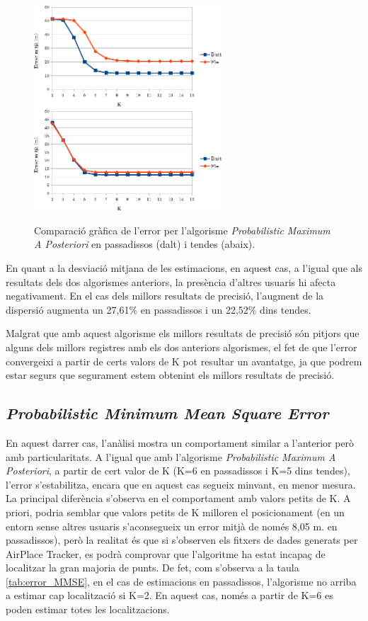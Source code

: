 \begin{figure}[ht]
\begin{center}
\includegraphics[width=7cm]{imatges/map_passadis.png}
\includegraphics[width=7cm]{imatges/map_tenda.png}
\caption{Comparació gràfica de l'error per l'algorisme \textit{Probabilistic Maximum A Posteriori} en passadissos (dalt) i tendes (abaix).}
\label{fig:grafic_MAP}
\end{center}
\end{figure}

En quant a la desviació mitjana de les estimacions, en aquest cas, a l'igual que als resultats dels dos algorismes anteriors, la presència d'altres usuaris hi afecta negativament. En el cas dels millors resultats de precisió, l'augment de la dispersió augmenta un 27,61\% en passadissos i un 22,52\% dins tendes.

Malgrat que amb aquest algorisme els millors resultats de precisió són pitjors que alguns dels millors registres amb els dos anteriors algorismes, el fet de que l'error convergeixi a partir de certs valors de K pot resultar un avantatge, ja que podrem estar segurs que segurament estem obtenint els millors resultats de precisió.

\subsection{\textit{Probabilistic Minimum Mean Square Error}}


En aquest darrer cas, l'anàlisi mostra un comportament similar a l'anterior però amb particularitats. A l'igual que amb l'algorisme \textit{Probabilistic Maximum A Posteriori}, a partir de cert valor de K (K=6 en passadissos i K=5 dins tendes), l'error s'estabilitza, encara que en aquest cas segueix minvant, en menor mesura. La principal diferència s'observa en el comportament amb valors petits de K. A priori, podria semblar que valors petits de K milloren el posicionament (en un entorn sense altres usuaris s'aconsegueix un error mitjà de només 8,05 m. en passadissos), però la realitat és que si s'observen els fitxers de dades generats per AirPlace Tracker, es podrà comprovar que l'algoritme ha estat incapaç de localitzar la gran majoria de punts. De fet, com s'observa a la taula \ref{tab:error_MMSE}, en el cas de estimacions en passadissos, l'algorisme no arriba a estimar cap localització si K=2. En aquest cas, només a partir de K=6 es poden estimar totes les localitzacions.


